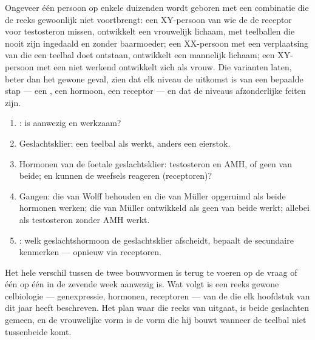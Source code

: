\begin{example}\label{ex:g11:becoming-male-female:disagree}
Ongeveer één persoon op enkele duizenden wordt geboren met een combinatie
die de reeks gewoonlijk niet voortbrengt: een XY-persoon van wie de 
de receptor voor testosteron missen, ontwikkelt een vrouwelijk lichaam,
met teelballen die nooit zijn ingedaald en zonder baarmoeder; een
XX-persoon met een verplaatsing van  die een teelbal doet ontstaan,
ontwikkelt een mannelijk lichaam; een XY-persoon met een niet werkend 
ontwikkelt zich als vrouw. Die varianten laten, beter dan het gewone
geval, zien dat elk niveau de uitkomst is van een bepaalde stap --- een
, een hormoon, een receptor --- en dat de niveaus afzonderlijke feiten
zijn.
\end{example}

\begin{method}\label{met:g11:becoming-male-female:case}
\begin{enumerate}
  \item {}: is  aanwezig en werkzaam?
  \item Geslachtsklier: een teelbal als  werkt, anders een eierstok.
  \item Hormonen van de foetale geslachtsklier: testosteron en AMH, of
        geen van beide; en kunnen de weefsels reageren (receptoren)?
  \item Gangen: die van Wolff behouden en die van Müller opgeruimd als
        beide hormonen werken; die van Müller ontwikkeld als geen van
        beide werkt; allebei als testosteron zonder AMH werkt.
  \item {}: welk geslachtshormoon de geslachtsklier afscheidt,
        bepaalt de secundaire kenmerken --- opnieuw via receptoren.
\end{enumerate}
\end{method}

\begin{remark}\label{rem:g11:becoming-male-female:onegene}
Het hele verschil tussen de twee bouwvormen is terug te voeren op de vraag
of één  op één  in de zevende week aanwezig is. Wat volgt is
een reeks gewone celbiologie --- genexpressie, hormonen, receptoren ---
van de  die elk hoofdstuk van dit jaar heeft beschreven. Het plan
waar die reeks van uitgaat, is beide geslachten gemeen, en de vrouwelijke
vorm is de vorm die hij bouwt wanneer de teelbal niet tussenbeide komt.
\end{remark}

